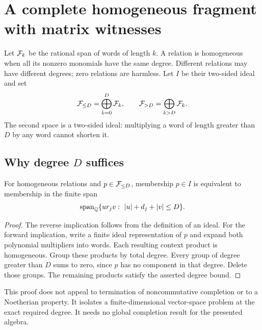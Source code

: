 \section{A complete homogeneous fragment with matrix witnesses}
\label{sec:homogeneous}

Let $\mathcal F_k$ be the rational span of words of length $k$. A relation is homogeneous
when all its nonzero monomials have the same degree. Different relations may
have different degrees; zero relations are harmless. Let $I$ be their two-sided
ideal and set
\[
 \mathcal F_{\le D}=\bigoplus_{k=0}^{D}\mathcal F_k,\qquad
 \mathcal F_{>D}=\bigoplus_{k>D}\mathcal F_k.
\]
The second space is a two-sided ideal: multiplying a word of length greater
than $D$ by any word cannot shorten it.

\subsection{Why degree \texorpdfstring{$D$}{D} suffices}

\begin{lemma}\label{lem:graded-membership}
For homogeneous relations and $p\in\mathcal F_{\le D}$, membership $p\in I$ is equivalent
to membership in the finite span
\[
 \operatorname{span}_\mathbb Q\{u r_jv:\ |u|+d_j+|v|\le D\}.
\]
\end{lemma}
\begin{proof}
The reverse implication follows from the definition of an ideal. For the forward
implication, write a finite ideal representation of $p$ and expand both
polynomial multipliers into words. Each resulting context product is
homogeneous. Group these products by total degree. Every group of degree greater
than $D$ sums to zero, since $p$ has no component in that degree. Delete those
groups. The remaining products satisfy the asserted degree bound.
\end{proof}

This proof does not appeal to termination of noncommutative completion or to a
Noetherian property. It isolates a finite-dimensional vector-space problem at
the exact required degree. It needs no global completion result for the presented algebra.

